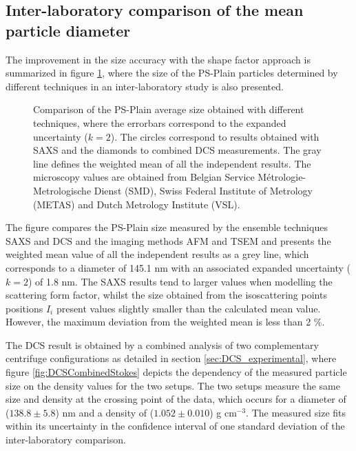 \subsection{Inter-laboratory comparison of the mean particle diameter}
\label{sec:interlab_size_comparison}
The improvement in the size accuracy with the shape factor approach is summarized in figure \ref{fig:PSPlainSizeComparison}, where the size of the PS-Plain particles determined by different techniques in an inter-laboratory study is also presented\citep{nicolet_inter-laboratory_2016}.

\begin{figure}
	\centering
		
	\caption[Comparison of the PS-Plain average size with different techniques.]{Comparison of the PS-Plain average size obtained with different techniques, where the errorbars correspond to the expanded uncertainty ($k=2$). The circles correspond to results obtained with SAXS and the diamonds to combined DCS measurements. The gray line defines the weighted mean of all the independent results. The microscopy values are obtained from Belgian Service Métrologie-Metrologische Dienst (SMD), Swiss Federal Institute of Metrology (METAS) and Dutch Metrology Institute (VSL).}
	\label{fig:PSPlainSizeComparison}
\end{figure}

The figure compares the PS-Plain size measured by the ensemble techniques SAXS and DCS and the imaging methods AFM and TSEM and presents the weighted mean value of all the independent results as a grey line, which corresponds to a diameter of 145.1 nm with an associated expanded uncertainty ($k=2$) of 1.8 nm. The SAXS results tend to larger values when modelling the scattering form factor, whilst the size obtained from the isoscattering points positions $I_i$ present values slightly smaller than the calculated mean value. However, the maximum deviation from the weighted mean is less than 2 $\%$.

The DCS result is obtained by a combined analysis of two complementary centrifuge configurations as detailed in section \ref{sec:DCS_experimental}, where figure \ref{fig:DCSCombinedStokes} depicts the dependency of the measured particle size on the density values for the two setups. The two setups measure the same size and density at the crossing point of the data, which occurs for a diameter of ($138.8\pm5.8$) nm and a density of ($1.052\pm0.010$) g cm$^{-3}$. The measured size fits within its uncertainty in the confidence interval of one standard deviation of the inter-laboratory comparison.


